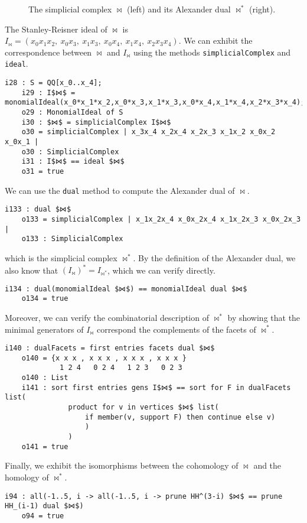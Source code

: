 \documentclass[12pt,leqno]{amsart}
\theoremstyle{definition}
\newenvironment{example}
{\pushQED{\qed}\renewcommand{\qedsymbol}{$\diamond$}\examplex}
{\popQED\endexamplex}
\begin{document}
\begin{example}
\begin{figure}[t]
\begin{subfigure}{0.3\textwidth}
    \end{subfigure}
    \caption{The simplicial complex $\bowtie$ (left) and its Alexander dual $\bowtie^*$ (right).}\label{the figure-8 and its dual}
  \end{figure}
  The Stanley-Reisner ideal of $\bowtie$ is $I_{\bowtie} = (x_0x_1x_2,\ x_0x_3,\ x_1x_3,\ x_0x_4,\ x_1x_4,\ x_2x_3x_4)$. We can exhibit the correspondence between $\bowtie$ and $I_{\bowtie}$ using the methods \texttt{simplicialComplex} and \texttt{ideal}.
  \begin{lstlisting}[basicstyle={\ttfamily \scriptsize}, xleftmargin=-23pt]
    i28 : S = QQ[x_0..x_4];
    i29 : I$⋈$ = monomialIdeal(x_0*x_1*x_2,x_0*x_3,x_1*x_3,x_0*x_4,x_1*x_4,x_2*x_3*x_4);
    o29 : MonomialIdeal of S
    i30 : $⋈$ = simplicialComplex I$⋈$
    o30 = simplicialComplex | x_3x_4 x_2x_4 x_2x_3 x_1x_2 x_0x_2 x_0x_1 |
    o30 : SimplicialComplex
    i31 : I$⋈$ == ideal $⋈$
    o31 = true
  \end{lstlisting}
  We can use the \texttt{dual} method to compute the Alexander dual of $\bowtie$.
\begin{lstlisting}[basicstyle={\ttfamily \scriptsize}, xleftmargin=-23pt]
    i133 : dual $⋈$
    o133 = simplicialComplex | x_1x_2x_4 x_0x_2x_4 x_1x_2x_3 x_0x_2x_3 |
    o133 : SimplicialComplex
\end{lstlisting}
  which is the simplicial complex $⋈^*$.
  By the definition of the Alexander dual, we also know that $(I_{\bowtie})^* = I_{\bowtie^*}$, which we can verify directly.
\begin{lstlisting}[basicstyle={\ttfamily \scriptsize}, xleftmargin=-23pt]
    i134 : dual(monomialIdeal $⋈$) == monomialIdeal dual $⋈$
    o134 = true
\end{lstlisting}
  Moreover, we can verify the combinatorial description of $\bowtie^*$ by showing that the minimal generators of $I_{\bowtie}$ correspond the complements of the facets of $\bowtie^*$.
\begin{lstlisting}[basicstyle={\ttfamily \scriptsize}, xleftmargin=-23pt]
    i140 : dualFacets = first entries facets dual $⋈$
    o140 = {x x x , x x x , x x x , x x x }
             1 2 4   0 2 4   1 2 3   0 2 3
    o140 : List
    i141 : sort first entries gens I$⋈$ == sort for F in dualFacets list(
               product for v in vertices $⋈$ list(
                   if member(v, support F) then continue else v)
                   )
               )
    o141 = true
\end{lstlisting}
  Finally, we exhibit the isomorphisms between the cohomology of $\bowtie$ and the homology of $\bowtie^*$.
\begin{lstlisting}[basicstyle={\ttfamily \scriptsize}, xleftmargin=-23pt]
    i94 : all(-1..5, i -> all(-1..5, i -> prune HH^(3-i) $⋈$ == prune HH_(i-1) dual $⋈$)
    o94 = true
\end{lstlisting}  
\end{example}
\end{document}

